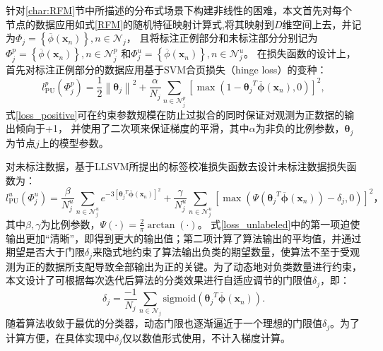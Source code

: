 针对\ref{char:RFM}节中所描述的分布式场景下构建非线性的困难，本文首先对每个节点的数据应用如式\eqref{RFM}的随机特征映射计算式,将其映射到$D$维空间上去，并记为$\boldsymbol \varPhi_j= \left\{\overline{\phi}\left(\boldsymbol x_n\right)\right\},n\in\mathcal{N}_j$，
且将标注正例部分和未标注部分分别记为$\boldsymbol \varPhi_j^p= \left\{\overline{\phi}\left(\boldsymbol x_n\right)\right\},n\in\mathcal{N}_j^p$
和$\boldsymbol \varPhi_j^u= \left\{\overline{\phi}\left(\boldsymbol x_n\right)\right\},n\in\mathcal{N}_j^u$。
在损失函数的设计上，首先对标注正例部分的数据应用基于SVM合页损失（hinge loss）的变种：
\begin{equation}
    \label{loss_positive}
    l_{\mathrm{PU}}^p\left(\boldsymbol \varPhi_j^p\right)=\frac{1}{2}\left\|\boldsymbol{\theta}_j\right\|^2
    +\frac{\alpha}{N_j} \sum_{n\in\mathcal{N}_j^p}\left[\max \left(1-{\boldsymbol{\theta}_j}^T\overline{\boldsymbol\phi}\left(\boldsymbol{x}_{n}\right), 0\right)\right]^{2},
\end{equation}
式\eqref{loss_positive}可在约束参数规模在防止过拟合的同时保证对观测为正数据的输出倾向于+1，
并使用了二次项来保证梯度的平滑，其中$\alpha$为非负的比例参数，$\boldsymbol{\theta}_j$为节点$j$上的模型参数。

对未标注数据，基于LLSVM所提出的标签校准损失函数去设计未标注数据损失函数为：
\begin{equation}
    \label{loss_unlabeled}
    l_{\mathrm{PU}}^u\left(\boldsymbol \varPhi_j^u\right)=
    \frac{\beta}{N_j^u} \sum_{n\in\mathcal{N}_j^u} e^{-3\left[{\boldsymbol{\theta}_j}^T\overline{\boldsymbol\phi}\left(\boldsymbol{x}_n\right)\right]^{2}} 
    + \frac{\gamma}{N_j^u} \sum_{n\in\mathcal{N}_j^u}\left[\max \left(\Psi\left({\boldsymbol{\theta}_j}^T\overline{\boldsymbol\phi}\left(\boldsymbol{x}_n\right)\right)-\delta_j, 0\right)\right]^{2}，
\end{equation}
其中$\beta,\gamma$为比例参数，$\Psi\left(\cdot\right)=\frac{2}{\pi}\arctan\left(\cdot\right)$。
式\eqref{loss_unlabeled}中的第一项迫使输出更加“清晰”，即得到更大的输出值；第二项计算了算法输出的平均值，并通过期望是否大于门限$\delta_j$来隐式地约束了算法输出负类的期望数量，使算法不至于受观测为正的数据所支配导致全部输出为正的关键。为了动态地对负类数量进行约束，本文设计了可根据每次迭代后算法的分类效果进行自适应调节的门限值$\delta_j$，即：
\begin{equation}
    \label{sigma_learning}
    \delta_j = \frac{-1}{N_j}
    \sum_{n\in\mathcal{N}_j}\mathrm{sigmoid}\left({\boldsymbol{\theta}_j}^T\overline{\boldsymbol\phi}\left(\boldsymbol{x}_n\right)\right).
\end{equation}
随着算法收敛于最优的分类器，动态门限也逐渐逼近于一个理想的门限值$\delta_j$。为了计算方便，在具体实现中$\delta_j$仅以数值形式使用，不计入梯度计算。

